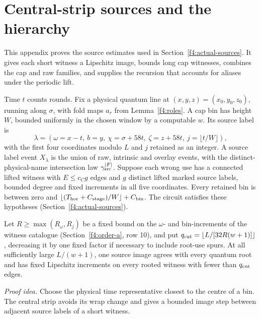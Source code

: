 \section{Central-strip sources and the hierarchy}\label{app:f4-sources}

This appendix proves the source estimates used in Section~\ref{f4:actual-sources}. It gives each short witness a Lipschitz image, bounds long cap witnesses, combines the cap and raw families, and supplies the recursion that accounts for aliases under the periodic lift.

Time \(t\) counts rounds. Fix a physical quantum
line at \((x,y,z)=(x_0,y_0,z_0)\), running along \(\sigma\), with
fold maps \(a_r\) from Lemma~\ref{f4:roles}. A cap bin has height
\(W\), bounded uniformly in the chosen window by a computable \(w\).
Its source label is
\[
 \lambda=(\omega=x-t,\ b=y,\ \chi=\sigma+58t,\ \zeta=z+58t,
                         \ j=\lfloor t/W\rfloor),
\]
with the first four coordinates modulo \(L\) and \(j\) retained as
an integer. A source label event \(X_\lambda\) is the union of raw, intrinsic
and overlay events, with the distinct-physical-name intersection law
\(\gamma_{\rm src}^{|F|}\). Suppose each wrong use has a connected lifted
witness with \(E\le c_Cg\) edges and \(g\) distinct lifted marked
source labels, bounded degree and fixed increments in all five coordinates.
Every retained bin is between zero and
\(\lfloor(T_{\rm hor}+C_{\rm stage})/W\rfloor+C_{\rm bin}\).
The circuit satisfies these hypotheses (Section~\ref{f4:actual-sources}).

\begin{lemma}\label{f4:strip}
Let \(R\ge\max(R_\omega,R_j)\) be a fixed bound on the \(\omega\)- and
bin-increments of the witness catalogue (Section~\ref{f4:order-a}, row 10), and put
\(q_{\rm cut}=\lfloor L/[32R(w+1)]\rfloor\), decreasing it by one
fixed factor if necessary to include root-use spurs. At all sufficiently
large \(L/(w+1)\), one source image agrees with every quantum root
and has fixed Lipschitz increments on every rooted witness with fewer
than \(q_{\rm cut}\) edges.
\end{lemma}
\par\noindent\emph{Proof idea.} Choose the physical time representative closest to the centre of a bin. The central strip avoids its wrap change and gives a bounded image step between adjacent source labels of a short witness.

